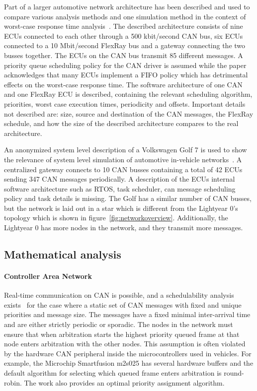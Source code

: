 Part of a larger automotive network architecture has been described and used to compare various analysis methods and one simulation method in the context of worst-case response time analysis~\cite{kollman2010comparative}. The described architecture consists of nine ECUs connected to each other through a 500 kbit/second CAN bus, six ECUs connected to a 10 Mbit/second FlexRay bus and a gateway connecting the two busses together. The ECUs on the CAN bus transmit 85 different messages. A priority queue scheduling policy for the CAN driver is assumed while the paper acknowledges that many ECUs implement a FIFO policy which has detrimental effects on the worst-case response time. The software architecture of one CAN and one FlexRay ECU is described, containing the relevant scheduling algorithm, priorities, worst case execution times, periodicity and offsets. Important details not described are: size, source and destination of the CAN messages, the FlexRay schedule, and how the size of the described architecture compares to the real architecture. 

An anonymized system level description of a Volkswagen Golf 7 is used to show the relevance of system level simulation of automotive in-vehicle networks~\cite{meyer2019simulation}. A centralized gateway connects to 10 CAN busses containing a total of 42 ECUs sending 347 CAN messages periodically. A description of the ECUs internal software architecture such as RTOS, task scheduler, can message scheduling policy and task details is missing. The Golf has a similar number of CAN busses, but the network is laid out in a star which is different from the Lightyear 0's topology which is shown in figure~\ref{fig:networkoverview}. Additionally, the Lightyear 0 has more nodes in the network, and they transmit more messages.

\subsection{Mathematical analysis}
\label{subsec:analysis}
\paragraph{Controller Area Network}
Real-time communication on CAN is possible, and a schedulability analysis exists~\cite{davis2007controller} for the case where a static set of CAN messages with fixed and unique priorities and message size. The messages have a fixed minimal inter-arrival time and are either strictly periodic or sporadic. The nodes in the network must ensure that when arbitration starts the highest priority queued frame at that node enters arbitration with the other nodes. This assumption is often violated by the hardware CAN peripheral inside the microcontrollers used in vehicles. For example, the Microchip Smartfusion m2s025 has several hardware buffers and the default algorithm for selecting which queued frame enters arbitration is round-robin. The work also provides an optimal priority assignment algorithm.


